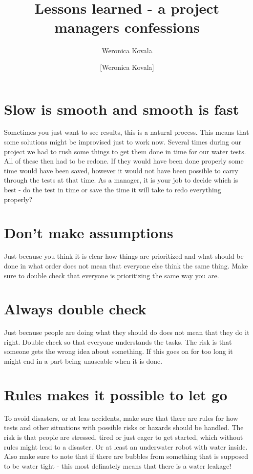 \documentclass[12pt,a4paper]{article}
\author{Weronica Kovala}
\title{Lessons learned - a project managers confessions}
\author{[Weronica Kovala]}    					%
\begin{document}
\maketitle
\section{Slow is smooth and smooth is fast}
Sometimes you just want to see results, this is a natural process. This means that some solutions might be improvised just to work now. Several times during our project we had to rush some things to get them done in time for our water tests. All of these then had to be redone. If they would have been done properly some time would have been saved, however it would not have been possible to carry through the tests at that time. As a manager, it is your job to decide which is best - do the test in time or save the time it will take to redo everything properly? 
\section{Don't make assumptions}
Just because you think it is clear how things are prioritized and what should be done in what order does not mean that everyone else think the same thing. Make sure to double check that everyone is prioritizing the same way you are. 

\section{Always double check}
Just because people are doing what they should do does not mean that they do it right. Double check so that everyone understands the tasks. The risk is that someone gets the wrong idea about something. If this goes on for too long it might end in a part being unuseable when it is done. 

\section{Rules makes it possible to let go}
To avoid disasters, or at leas accidents, make sure that there are rules for how tests and other situations with possible risks or hazards should be handled. The risk is that people are stressed, tired or just eager to get started, which without rules might lead to a disaster. Or at least an underwater robot with water inside. Also make sure to note that if there are bubbles from something that is supposed to be water tight - this most definately means that there is a water leakage!
\end{document}
